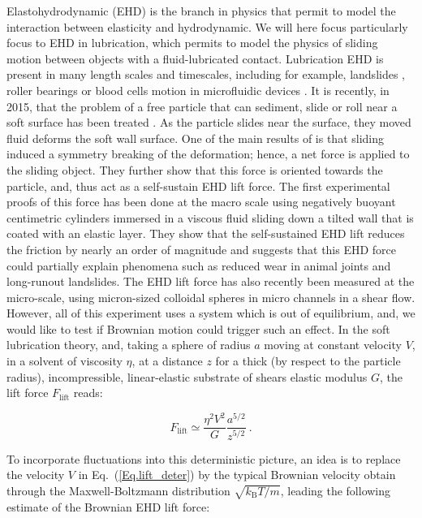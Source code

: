 Elastohydrodynamic (\gls{EHD}) is the branch in physics that permit to model the interaction between elasticity and hydrodynamic. We will here focus particularly focus to \gls{EHD} in lubrication, which permits to model the physics of sliding motion between objects with a fluid-lubricated contact. Lubrication \gls{EHD} is present in many length scales and timescales, including for example, landslides \cite{campbell_self-lubrication_1989}, roller bearings \cite{hamrock_fundamentals_2004} or blood cells motion in microfluidic devices \cite{byun_characterizing_2013, higgins_sickle_2007, cohen_hydrodynamics_2013}. It is recently, in 2015, that the problem of a free particle that can sediment, slide or roll near a soft surface has been treated  \cite{salez_elastohydrodynamics_2015}. As the particle slides near the surface, they moved fluid deforms the soft wall surface. One of the main results of \cite{salez_elastohydrodynamics_2015} is that sliding induced a symmetry breaking of the deformation; hence, a net force is applied to the sliding object. They further show that this force is oriented towards the particle, and, thus act as a self-sustain \gls{EHD} lift force. The first experimental proofs of this force has been done at the macro scale using negatively buoyant centimetric cylinders immersed in a viscous fluid sliding down a tilted wall that is coated with an elastic layer. They show that the self-sustained \gls{EHD} lift reduces the friction by nearly an order of magnitude and suggests that this \gls{EHD} force could partially explain phenomena such as reduced wear in animal joints and long-runout landslides. The \gls{EHD} lift force has also recently been measured at the micro-scale, using micron-sized colloidal spheres in micro channels in a shear flow. However, all of this experiment uses a system which is out of equilibrium, and, we would like to test if Brownian motion could trigger such an effect. In the soft lubrication theory, and, taking a sphere of radius $a$ moving at constant velocity $V$, in a solvent of viscosity $\eta$, at a distance $z$ for a thick (by respect to the particle radius), incompressible, linear-elastic substrate of shears elastic modulus $G$, the lift force $F_\mathrm{lift}$ reads:

\begin{equation}
	F_\mathrm{lift} \simeq \frac{\eta^2 V^2}{G} \frac{a^{5/2}}{z^{5/2}} ~.
	\label{Eq.lift_deter}
\end{equation}

To incorporate fluctuations into this deterministic picture, an idea is to replace the velocity $V$ in Eq.~(\ref{Eq.lift_deter}) by the typical Brownian velocity obtain through the Maxwell-Boltzmann distribution $\sqrt{k_\mathrm{B}T / m}$, leading the following estimate of the Brownian \gls{EHD} lift force:

